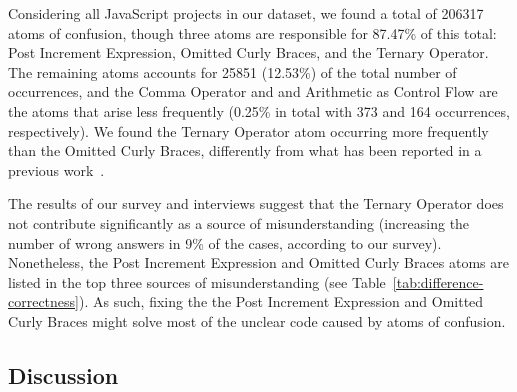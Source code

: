 Considering all JavaScript projects in our dataset, we found 
a total of \num{206317} atoms of confusion, though three atoms are responsible for 87.47\% of this total: Post Increment Expression, Omitted Curly Braces, and the Ternary Operator. The remaining atoms accounts for \num{25851} (12.53\%) of the total number of occurrences, and the Comma Operator and and Arithmetic as Control Flow are the atoms that arise less frequently (0.25\% in total with 373 and 164 occurrences, respectively).
We found the Ternary Operator atom occurring more frequently than the Omitted Curly Braces, differently from what has been reported in a previous work~\cite{DBLP:conf/msr/GopsteinZFC18}. 

The results of our survey and interviews suggest that the Ternary Operator does not contribute significantly as a source of misunderstanding (increasing the number of wrong answers in 9\% of the cases, according to our survey). Nonetheless, the Post Increment Expression and Omitted Curly Braces atoms are listed in the top three sources of misunderstanding 
(see Table~\ref{tab:difference-correctness}). As such, fixing the the Post Increment Expression and Omitted Curly Braces might solve most of the unclear code caused by atoms of confusion. 



\subsection{Discussion}
\label{sec:discussion}
